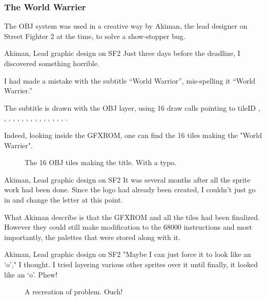 \subsubsection{The World Warrier}
The OBJ system was used in a creative way by Akiman, the lead designer on Street Fighter 2 at the time, to solve a show-stopper bug.

\begin{q}{Akiman, Lead graphic design on SF2}
Just three days before the deadline, I discovered something horrible. 

I had made a mistake with the subtitle “World Warrior”, mis-spelling it “World Warrier.”
\end{q}

The subtitle is drawn with the OBJ layer, using 16 draw calls pointing to tileID , , , , , , , , , , , , , , , . 

Indeed, looking inside the GFXROM, one can find the 16 tiles making the "World Warrier". 

\begin{figure}[H]
 \caption*{The 16 OBJ tiles making the title. With a typo.}%
 \end{figure}%

\begin{q}{Akiman, Lead graphic design on SF2}
It was several months after all the sprite work had been done. Since the logo had already been created, I couldn't just go in and change the letter at this point.
\end{q}

What Akiman describe is that the GFXROM and all the tiles had been finalized. However they could still make modification to the 68000 instructions and most importantly, the palettes that were stored along with it.

\begin{q}{Akiman, Lead graphic design on SF2}
"Maybe I can just force it to look like an ‘o’," I thought. I tried layering various other sprites over it until finally, it looked like an ‘o’. Phew!
\end{q}

\begin{figure}[H]
 \caption*{A recreation of problem. Ouch!}%
 \end{figure}%



